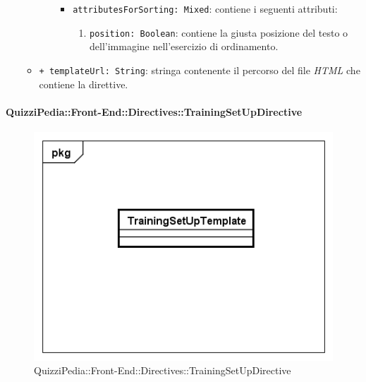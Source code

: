 \begin{itemize}
\begin{itemize}
\begin{itemize}
\begin{itemize}
						\item \texttt{attributesForSorting: Mixed}: contiene i seguenti attributi:
						\begin{enumerate}
							\item \texttt{position: Boolean}: contiene la giusta posizione del testo o dell'immagine nell'esercizio di ordinamento.
						\end{enumerate}
					\end{itemize}
				\end{itemize}
				\item \texttt{+ templateUrl: String}: stringa contenente il percorso del file \textit{HTML} che contiene la direttive.
			\end{itemize}
		\end{itemize}
		
		\paragraph{QuizziPedia::Front-End::Directives::TrainingSetUpDirective}
		
		\label{QuizziPedia::Front-End::Directives::TrainingSetUpDirective}
		
		\begin{figure}[ht]
			\centering
			\includegraphics[scale=0.80,keepaspectratio]{UML/Classi/Front-End/QuizziPedia_Front-end_Templates_TrainingSetUpTemplate.png}
			\caption{QuizziPedia::Front-End::Directives::TrainingSetUpDirective}
		\end{figure} \FloatBarrier
		

